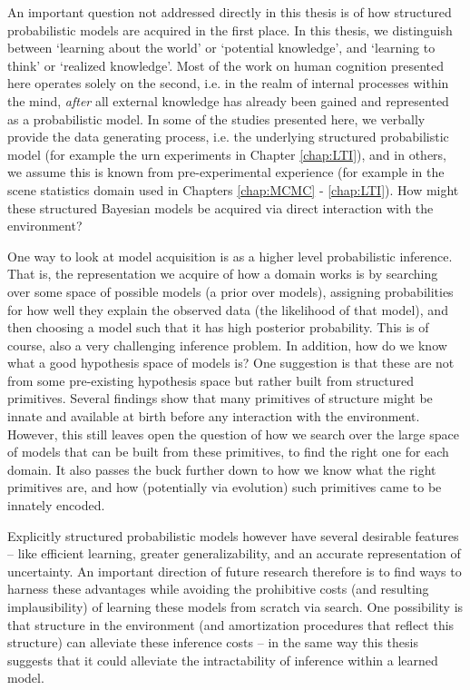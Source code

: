 An important question not addressed directly in this thesis is of how structured probabilistic models are acquired in the first place. In this thesis, we distinguish between `learning about the world' or `potential knowledge', and `learning to think' or `realized knowledge'. Most of the work on human cognition presented here operates solely on the second, i.e. in the realm of internal processes within the mind, \textit{after} all external knowledge has already been gained and represented as a probabilistic model. In some of the studies presented here, we verbally provide the data generating process, i.e. the underlying structured probabilistic model (for example the urn experiments in Chapter \ref{chap:LTI}), and in others, we assume this is known from pre-experimental experience (for example in the scene statistics domain used in Chapters \ref{chap:MCMC} - \ref{chap:LTI}). How might these structured Bayesian models be acquired via direct interaction with the environment?

One way to look at model acquisition is as a higher level probabilistic inference. That is, the representation we acquire of how a domain works is by searching over some space of possible models (a prior over models), assigning probabilities for how well they explain the observed data (the likelihood of that model), and then choosing a model such that it has high posterior probability. This is of course, also a very challenging inference problem.\citep{schulz2012finding, bramley2018grounding} In addition, how do we know what a good hypothesis space of models is? One suggestion is that these are not from some pre-existing hypothesis space but rather built from structured primitives. Several findings show that many primitives of structure might be innate and available at birth before any interaction with the environment.\citep{spelke1998nativism, chomsky1967recent} However, this still leaves open the question of how we search over the large space of models that can be built from these primitives, to find the right one for each domain. It also passes the buck further down to how we know what the right primitives are, and how (potentially via evolution) such primitives came to be innately encoded. 


Explicitly structured probabilistic models however have several desirable features -- like efficient learning\citep{kemp2007learning}, greater generalizability\citep{lake2017building}, and an accurate representation of uncertainty\citep{hacking2006emergence}. An important direction of future research therefore is to find ways to harness these advantages while avoiding the prohibitive costs (and resulting implausibility) of learning these models from scratch via search. One possibility is that structure in the environment (and amortization procedures that reflect this structure) can alleviate these inference costs -- in the same way this thesis suggests that it could alleviate the intractability of inference within a learned model. 

